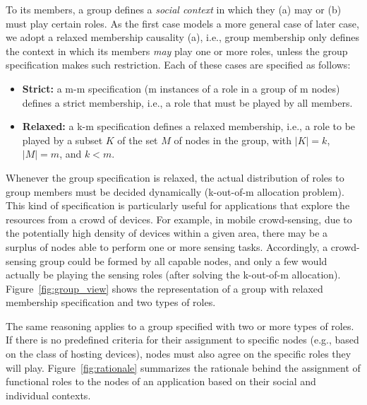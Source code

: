 To its members, a group defines a \textit{social context} in which they (a) may or (b) must play certain roles. As the first case models a more general case of later case, we adopt a relaxed membership causality (a), i.e., group membership only defines the context in which its members \textit{may} play one or more roles, unless the group specification makes such restriction. Each of these cases are specified as follows:

\begin{itemize}
	
	\item \textbf{Strict:} a m-m specification (m instances of a role in a group of m nodes) defines a strict membership, i.e., a role that must be played by all members.
	
	\item \textbf{Relaxed:} a k-m specification defines a relaxed membership, i.e., a role to be played by a subset $K$ of the set $M$ of nodes in the group, with $|K| = k$, $|M| = m$, and $k < m$.
	
\end{itemize}

Whenever the group specification is relaxed, the actual distribution of roles to group members must be decided dynamically (k-out-of-m allocation problem). This kind of specification is particularly useful for applications that explore the resources from a crowd of devices. For example, in mobile crowd-sensing, due to the potentially high density of devices within a given area, there may be a surplus of nodes able to perform one or more sensing tasks. Accordingly, a crowd-sensing group could be formed by all capable nodes, and only a few would actually be playing the sensing roles (after solving the k-out-of-m allocation). Figure~\ref{fig:group_view} shows the representation of a group with relaxed membership specification and two types of roles.

The same reasoning applies to a group specified with two or more types of roles. If there is no predefined criteria for their assignment to specific nodes (e.g., based on the class of hosting devices), nodes must also agree on the specific roles they will play. Figure~\ref{fig:rationale} summarizes the rationale behind the assignment of functional roles to the nodes of an application based on their social and individual contexts.


